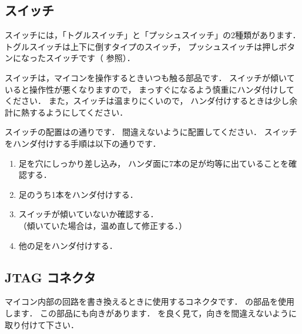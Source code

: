 \subsection{スイッチ}


スイッチには，「トグルスイッチ」と「プッシュスイッチ」の2種類があります．
トグルスイッチは上下に倒すタイプのスイッチ，
プッシュスイッチは押しボタンになったスイッチです（ 参照）．



スイッチは，マイコンを操作するときいつも触る部品です．
スイッチが傾いていると操作性が悪くなりますので，
まっすぐになるよう慎重にハンダ付けしてください．
また，スイッチは温まりにくいので，
ハンダ付けするときは少し余計に熱するようにしてください．

スイッチの配置はの通りです．
間違えないように配置してください．
スイッチをハンダ付けする手順は以下の通りです．

\begin{enumerate}
\item 足を穴にしっかり差し込み，
ハンダ面に7本の足が均等に出ていることを確認する．
\item 足のうち1本をハンダ付けする．
\item スイッチが傾いていないか確認する．\\
（傾いていた場合は，温め直して修正する．）
\item 他の足をハンダ付けする．
\end{enumerate}


\subsection{JTAG コネクタ}
マイコン内部の回路を書き換えるときに使用するコネクタです．
の部品を使用します．
この部品にも向きがあります．
を良く見て，向きを間違えないように取り付けて下さい．

